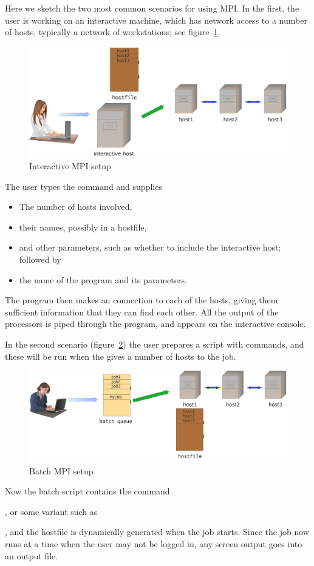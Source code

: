 Here we sketch the two most common scenarios for using MPI. In the
first, the user is working on an interactive machine, which has
network access to a number of hosts, typically a network of workstations;
see figure~\ref{fig:mpi-interactive}.
\begin{figure}[ht]
  \includegraphics[scale=.12]{graphics/mpi-interactive}
  \caption{Interactive MPI setup}
  \label{fig:mpi-interactive}
\end{figure}
The user types the command  and supplies
\begin{itemize}
\item The number of hosts involved,
\item their names, possibly in a hostfile,
\item and other parameters, such as whether to include the interactive
  host; followed by
\item the name of the program and its parameters.
\end{itemize}
The  program then makes an  connection
to each of the hosts, giving them sufficient information that they 
can find each other. All the output of the processors is piped through the 
 program, and appears on the interactive console.

In the second scenario (figure~\ref{fig:mpi-batch}) the user prepares
a  script with commands, and these will be
run when the  gives a number of hosts
to the job.
\begin{figure}[ht]
  \includegraphics[scale=.1]{graphics/mpi-batch}
  \caption{Batch MPI setup}
  \label{fig:mpi-batch}
\end{figure}
Now the batch script contains the  command%
\begin{istc}
, or some variant such as %
\end{istc}
, and the hostfile is dynamically generated when the job starts.
Since the job now runs at a time when the user may not be logged in, 
any screen output goes into an output file.

